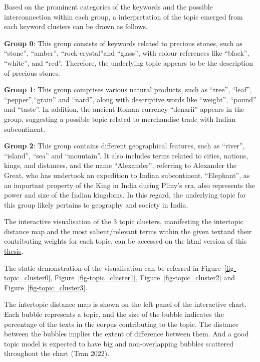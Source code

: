 \documentclass[
  12pt,
]{article}
\begin{document}
Based on the prominent categories of the keywords and the possible
interconnection within each group, a interpretation of the topic emerged
from each keyword clusters can be drawn as follows.

\textbf{Group 0}: This group consists of keywords related to precious
stones, such as ``stone'', ``amber'', ``rock-crystal''and ``glass'',
with colour references like ``black'', ``white'', and ``red''.
Therefore, the underlying topic appears to be the description of
precious stones.

\textbf{Group 1}: This group comprises various natural products, such as
``tree'', ``leaf'', ``pepper'',``grain'' and ``nard'', along with
descriptive words like ``weight'', ``pound'' and ``taste''. In addition,
the ancient Roman currency ``denarii'' appears in the group, suggesting
a possible topic related to merchandise trade with Indian subcontinent.

\textbf{Group 2}: This group contains different geographical features,
such as ``river'', ``island'', ``sea'' and ``mountain''. It also
includes terms related to cities, nations, kings, and distances, and the
name ``Alexander'', referring to Alexander the Great, who has undertook
an expedition to Indian subcontinent. ``Elephant'', as an important
property of the King in India during Pliny's era, also represents the
power and size of the Indian kingdoms. In this regard, the underlying
topic for this group likely pertains to geography and society in India.

The interactive visualisation of the 3 topic clusters, manifesting the
intertopic distance map and the most salient/relevant terms within the
given textand their contributing weights for each topic, can be accessed
on the html version of this
\href{https://raw.githack.com/lizaodawn/NH_thesis/main/NHthesis_structure.html}{thesis}.

The static demonstration of the visualisation can be referred in
Figure~\ref{fig-topic_cluster0}, Figure~\ref{fig-topic_cluster1},
Figure~\ref{fig-topic_cluster2} and Figure~\ref{fig-topic_cluster3}.

The intertopic distance map is shown on the left panel of the
interactive chart. Each bubble represents a topic, and the size of the
bubble indicates the percentage of the texts in the corpus contributing
to the topic. The distance between the bubbles implies the extent of
difference between them. And a good topic model is expected to have big
and non-overlapping bubbles scattered throughout the chart (Tran 2022).
\end{document}
